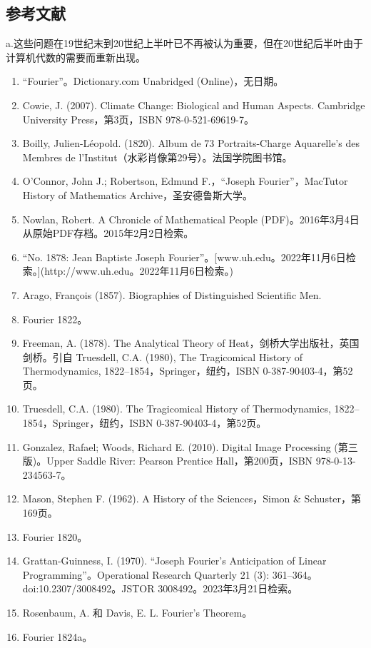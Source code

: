 \subsection{参考文献}
a.这些问题在19世纪末到20世纪上半叶已不再被认为重要，但在20世纪后半叶由于计算机代数的需要而重新出现。
\begin{enumerate}
\item “Fourier”。Dictionary.com Unabridged (Online)，无日期。
\item Cowie, J. (2007). Climate Change: Biological and Human Aspects. Cambridge University Press，第3页，ISBN 978-0-521-69619-7。
\item Boilly, Julien-Léopold. (1820). Album de 73 Portraits-Charge Aquarelle’s des Membres de l’Institut（水彩肖像第29号）。法国学院图书馆。
\item O'Connor, John J.; Robertson, Edmund F.，“Joseph Fourier”，MacTutor History of Mathematics Archive，圣安德鲁斯大学。
\item Nowlan, Robert. A Chronicle of Mathematical People (PDF)。2016年3月4日从原始PDF存档。2015年2月2日检索。
\item “No. 1878: Jean Baptiste Joseph Fourier”。[www.uh.edu。2022年11月6日检索。](http://www.uh.edu。2022年11月6日检索。)
\item Arago, François (1857). Biographies of Distinguished Scientific Men.
\item Fourier 1822。
\item Freeman, A. (1878). The Analytical Theory of Heat，剑桥大学出版社，英国剑桥。引自 Truesdell, C.A. (1980), The Tragicomical History of Thermodynamics, 1822–1854，Springer，纽约，ISBN 0-387-90403-4，第52页。
\item Truesdell, C.A. (1980). The Tragicomical History of Thermodynamics, 1822–1854，Springer，纽约，ISBN 0-387-90403-4，第52页。
\item Gonzalez, Rafael; Woods, Richard E. (2010). Digital Image Processing (第三版)。Upper Saddle River: Pearson Prentice Hall，第200页，ISBN 978-0-13-234563-7。
\item Mason, Stephen F. (1962). A History of the Sciences，Simon & Schuster，第169页。
\item Fourier 1820。
\item Grattan-Guinness, I. (1970). “Joseph Fourier's Anticipation of Linear Programming”。Operational Research Quarterly 21 (3): 361–364。doi:10.2307/3008492。JSTOR 3008492。2023年3月21日检索。
\item Rosenbaum, A. 和 Davis, E. L. Fourier's Theorem。
\item Fourier 1824a。

\end{enumerate}
